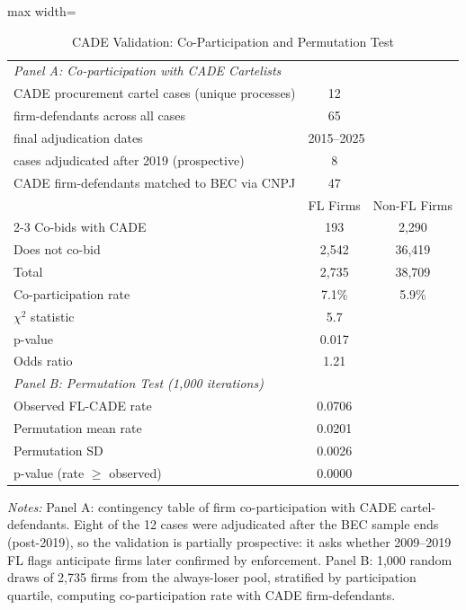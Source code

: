 \begin{table}[htbp]
\centering
\caption{CADE Validation: Co-Participation and Permutation Test}
\label{tab:cade_permutation}
\begin{adjustbox}{max width=\textwidth}
\begin{threeparttable}
\small
\begin{tabular}{lcc}
\toprule
\midrule
\textit{Panel A: Co-participation with CADE Cartelists} & & \\
CADE procurement cartel cases (unique processes) & 12 & \\
\quad firm-defendants across all cases & 65 & \\
\quad final adjudication dates & \multicolumn{2}{l}{2015--2025} \\
\quad cases adjudicated after 2019 (prospective) & 8 & \\
CADE firm-defendants matched to BEC via CNPJ & 47 & \\
\midrule
 & FL Firms & Non-FL Firms \\
\cmidrule(lr){2-3}
Co-bids with CADE & 193 & 2,290 \\
Does not co-bid & 2,542 & 36,419 \\
Total & 2,735 & 38,709 \\
Co-participation rate & 7.1\% & 5.9\% \\
\midrule
$\chi^2$ statistic & 5.7 & \\
p-value & 0.017 & \\
Odds ratio & 1.21 & \\
\midrule
\textit{Panel B: Permutation Test (1,000 iterations)} & & \\
Observed FL-CADE rate & 0.0706 & \\
Permutation mean rate & 0.0201 & \\
Permutation SD & 0.0026 & \\
p-value (rate $\geq$ observed) & 0.0000 & \\
\bottomrule
\end{tabular}
\begin{tablenotes}
\small
\item \textit{Notes:} Panel A: contingency table of firm co-participation
with CADE cartel-defendants. Eight of the 12 cases were adjudicated
after the BEC sample ends (post-2019), so the validation is partially
prospective: it asks whether 2009--2019 FL flags anticipate firms
later confirmed by enforcement. Panel B: 1,000 random draws of
2,735 firms from the always-loser pool, stratified by participation
quartile, computing co-participation rate with CADE firm-defendants.
\end{tablenotes}
\end{threeparttable}
\end{adjustbox}
\end{table}
